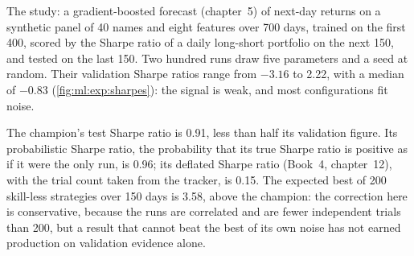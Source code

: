 The study: a gradient-boosted forecast (chapter~5) of next-day returns on a synthetic panel of 40 names and eight features over
700 days, trained on the first 400, scored by the Sharpe ratio of a daily long-short portfolio on the next 150, and tested on the
last 150. Two hundred runs draw five parameters and a seed at random. Their validation Sharpe ratios range from $-3.16$ to 2.22,
with a median of $-0.83$ (\cref{fig:ml:exp:sharpes}): the signal is weak, and most configurations fit noise.

\begin{omfigure}

\label{fig:ml:exp:sharpes}
\end{omfigure}

The champion's test Sharpe ratio is 0.91, less than half its validation figure. Its probabilistic Sharpe ratio, the
probability that its true Sharpe ratio is positive as if it were the only run, is 0.96; its deflated Sharpe ratio (Book~4,
chapter~12), with the trial count taken from the tracker, is 0.15. The expected best of 200 skill-less strategies over 150 days
is 3.58, above the champion: the correction here is conservative, because the runs are correlated and are fewer independent
trials than 200, but a result that cannot beat the best of its own noise has not earned production on validation evidence
alone.

